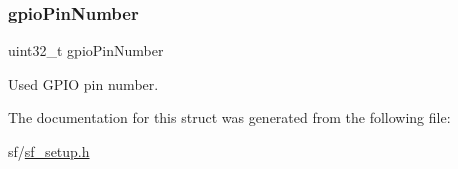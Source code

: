 \subsubsection{\texorpdfstring{gpioPinNumber}{gpioPinNumber}}
{\footnotesize\ttfamily uint32\+\_\+t gpio\+Pin\+Number}

Used G\+P\+IO pin number. 

The documentation for this struct was generated from the following file\+:\begin{DoxyCompactItemize}
\item 
sf/\mbox{\hyperlink{sf__setup_8h}{sf\+\_\+setup.\+h}}\end{DoxyCompactItemize}
